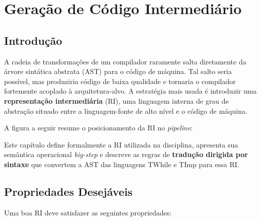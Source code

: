 \chapter{Geração de Código Intermediário}

\section{Introdução}

A cadeia de transformações de um compilador raramente salta diretamente da
árvore sintática abstrata (AST) para o código de máquina.  Tal salto seria
possível, mas produziria código de baixa qualidade e tornaria o compilador
fortemente acoplado à arquitetura-alvo.  A estratégia mais usada é
introduzir uma
\textbf{representação intermediária} (RI), uma linguagem interna de grau de
abstração situado entre a linguagem-fonte de alto nível e o código de máquina.

A figura a seguir resume o posicionamento da RI no \emph{pipeline}:

\begin{center}
\end{center}

Este capítulo define formalmente a RI utilizada na disciplina, apresenta sua
semântica operacional \emph{big-step} e descreve as regras de
\textbf{tradução dirigida por sintaxe} que convertem a AST das linguagens
TWhile e TImp para essa RI.

\section{Propriedades Desejáveis}\label{sec:ir-desiderata}

Uma boa RI deve satisfazer as seguintes propriedades:

